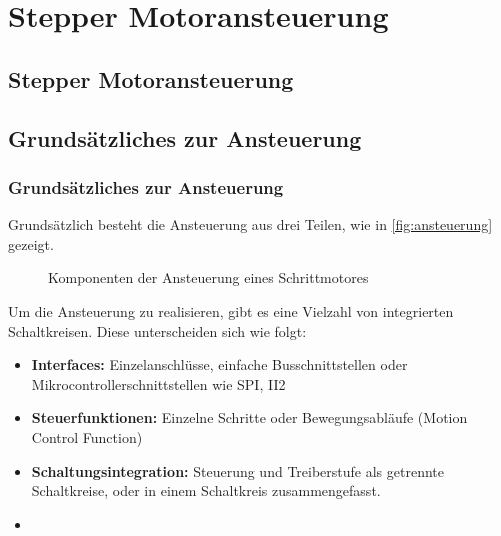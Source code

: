 \ifSTANDALONE
\section{Stepper Motoransteuerung}
\fi
\ifEMBED
\subsection{Stepper Motoransteuerung}
\fi

\ifEMBED
    \BLDCcollab
\fi
\ifSTANDALONE
    \subsection{Grundsätzliches zur Ansteuerung}\label{subsec:Ansteuerung}
\fi
\ifEMBED
    \subsubsection{Grundsätzliches zur Ansteuerung}\label{subsec:Ansteuerung}
\fi
	Grundsätzlich besteht die Ansteuerung aus drei Teilen, wie in 
    \autoref*{fig:ansteuerung} gezeigt. 
	\begin{figure}[h!]
		\centering
		\caption{Komponenten der Ansteuerung eines Schrittmotores}
		\label{fig:ansteuerung}
	\end{figure}
    Um die Ansteuerung zu realisieren, gibt es eine Vielzahl von 
    integrierten Schaltkreisen. Diese unterscheiden sich wie folgt: 
    \begin{itemize}
    	\item \textbf{Interfaces:} Einzelanschlüsse, einfache 
            Busschnittstellen oder Mikrocontrollerschnittstellen wie SPI, 
            II2
    	\item \textbf{Steuerfunktionen:} Einzelne Schritte oder 
            Bewegungsabläufe (Motion Control Function)
    	\item \textbf{Schaltungsintegration:} Steuerung und Treiberstufe als 
            getrennte Schaltkreise, oder in einem Schaltkreis zusammengefasst. 
        \item[] \cite{Doku:Stepper} 
    \end{itemize}
    

